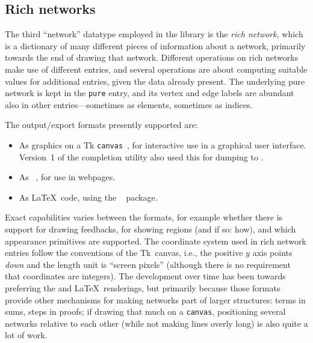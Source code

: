 \documentclass{article}
\theoremstyle{definition}
\begin{document}
\subsection{Rich networks}
\label{Ssec:RichNetworks}

The third ``network'' datatype employed in the library is the 
\emph{rich network}, which is a dictionary of many different pieces 
of information about a network, primarily towards the end of drawing 
that network. Different operations on rich networks make use of 
different entries, and several operations are about computing 
suitable values for additional entries, given the data already 
present. The underlying pure network is kept in the \texttt{pure} 
entry, and its vertex and edge labels are abundant also in other 
entries---sometimes as elements, sometimes as indices.

The output\slash export formats presently supported are:
\begin{itemize}
  \item
    As graphics on a Tk \texttt{canvas}~\cite{Tk-canvas}, for 
    interactive use in a graphical user interface. Version~1 of the 
    completion utility also used this for dumping to .
  \item
    As ~\cite{McCormack:11:SVG}, for use in webpages.
  \item
    As \LaTeX\ code, using the ~\cite{TikZ-PGF} package.
\end{itemize}
Exact capabilities varies between the formats, for example whether 
there is support for drawing feedbacks, for showing regions (and if 
so: how), and which appearance primitives are supported. The 
coordinate system used in rich network entries follow the conventions 
of the Tk~canvas, i.e., the positive $y$ axis points \emph{down} and 
the length unit is ``screen pixels'' (although there is no 
requirement that coordinates are integers).
The development over time has been towards preferring the  
and \LaTeX\ renderings, but primarily because those formats provide other 
mechanisms for making networks part of larger structures: terms in 
sums, steps in proofs; if drawing that much on a \texttt{canvas}, 
positioning several networks relative to each other (while not making 
lines overly long) is also quite a lot of work.
\end{document}
